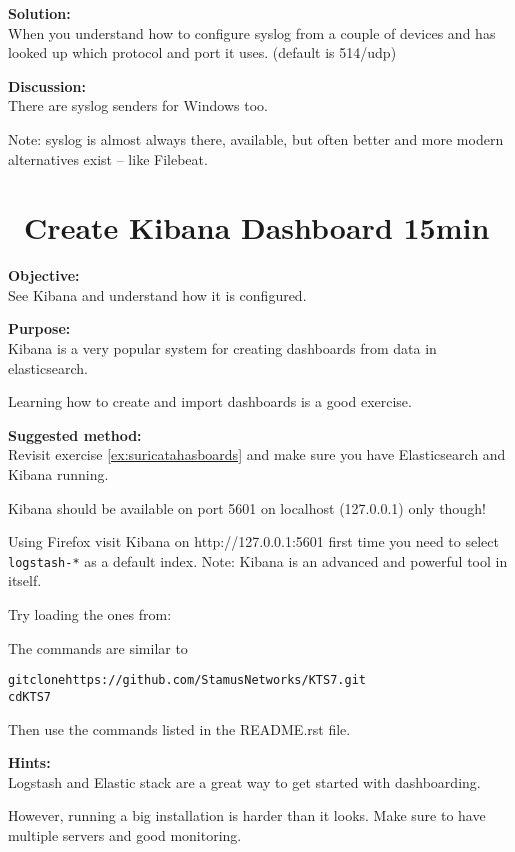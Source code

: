 \documentclass[a4paper,11pt,notitlepage]{report}
\begin{document}
{\bf Solution:}\\
When you understand how to configure syslog from a couple of devices and has looked up which protocol and port it uses. (default is 514/udp)

{\bf Discussion:}\\
There are syslog senders for Windows too.

Note: syslog is almost always there, available, but often better and more modern alternatives exist -- like Filebeat.


\chapter{\faInfoCircle\ Create Kibana Dashboard 15min}
\label{ex:kibana-dashboard}

{\bf Objective:}\\
See Kibana and understand how it is configured.

{\bf Purpose:}\\
Kibana is a very popular system for creating dashboards from data in elasticsearch.

Learning how to create and import dashboards is a good exercise.

{\bf Suggested method:}\\
Revisit exercise \ref{ex:suricatahasboards} and make sure you have Elasticsearch and Kibana running.

Kibana should be available on port 5601 on localhost (127.0.0.1) only though!

Using Firefox visit Kibana on http://127.0.0.1:5601 first time you need to
 select \verb+logstash-*+ as a default index. Note: Kibana is an advanced and powerful tool in itself.

Try loading the ones from:

The commands are similar to
\begin{alltt}
git clone https://github.com/StamusNetworks/KTS7.git
cd KTS7
\end{alltt}

Then use the commands listed in the README.rst file.

{\bf Hints:}\\
Logstash and Elastic stack are a great way to get started with dashboarding.

However, running a big installation is harder than it looks. Make sure to have multiple servers and good monitoring.
\end{document}
